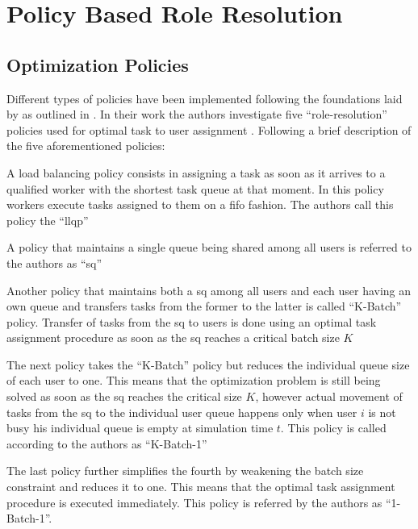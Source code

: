 \chapter{Policy Based Role Resolution}

\section{Optimization Policies}
\label{sec:opt_policies}

Different types of policies have been implemented following the foundations laid by \citet{Zeng2005} as outlined in . In their work the authors investigate five ``role-resolution'' policies used for optimal task to user assignment \citep[p. 7]{Zeng2005}. Following a brief description of the five aforementioned policies:
\begin{enumerate*}
	\item A load balancing policy consists in assigning a task as soon as it arrives to a qualified worker with the shortest task queue at that moment. In this policy workers execute tasks assigned to them on a \gls{fifo} fashion. The authors call this policy the ``\gls{llqp}''
	\item A policy that maintains a single queue being shared among all users is referred to the authors as ``\gls{sq}''
	\item Another policy that maintains both a \gls{sq} among all users and each user having an own queue and transfers tasks from the former to the latter is called ``K-Batch'' policy. Transfer of tasks from the \gls{sq} to users is done using an optimal task assignment procedure as soon as the \gls{sq} reaches a critical batch size $K$
	\item The next policy takes the ``K-Batch'' policy but reduces the individual queue size of each user to one. This means that the optimization problem is still being solved as soon as the \gls{sq} reaches the critical size $K$, however actual movement of tasks from the \gls{sq} to the individual user queue happens only when user $i$ is not busy \ie his individual queue is empty at simulation time $t$. This policy is called according to the authors as ``K-Batch-1''
	\item The last policy further simplifies the fourth by weakening the batch size constraint and reduces it to one. This means that the optimal task assignment procedure is executed immediately. This policy is referred by the authors as ``1-Batch-1''.
\end{enumerate*}

